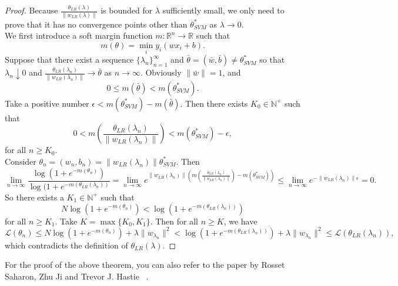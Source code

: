 \begin{proof}
	Because $\frac{\theta_{LR}(\lambda)}{\|w_{LR}(\lambda)\|}$ is bounded for $\lambda$ sufficiently small, we only need to prove that it has no convergence points other than $\theta^*_{SVM}$ as $\lambda \rightarrow 0$.\\
	We first introduce a soft margin function $m: \mathbb{R}^n \rightarrow \mathbb{R}$ such that 
	\begin{equation}
		m(\theta) = \min_{i} y_i(wx_i + b).
	\end{equation}
	Suppose that there exist a sequence $\{\lambda_n\}_{n = 1}^\infty$ and $\bar{\theta} = (\bar{w},\bar{b}) \neq \theta^*_{SVM}$ so that  $\lambda_n \downarrow 0$ and $\frac{\theta_{LR}(\lambda_n)}{\|w_{LR}(\lambda_n)\|} \rightarrow \bar{\theta}$ as $n\rightarrow \infty$. Obviously $\|\bar{w}\| = 1$, and 
    \begin{equation}
    	0 \leq m(\bar{\theta}) < m(\theta^*_{SVM}).
    \end{equation}
     Take a positive number $\epsilon < m(\theta^*_{SVM}) - m(\bar{\theta})$. Then there exists $K_0\in \mathbb{N}^+$ such that 
    \begin{equation}
    0 < m(\frac{\theta_{LR}(\lambda_n)}{\|w_{LR}(\lambda_n)\|}) <  m(\theta^*_{SVM})- \epsilon,
    \end{equation}
    for all $n \geq K_0$.\\
    
    Consider $\theta_n = (w_n,b_n) = \|w_{LR}(\lambda_n)\|\theta^*_{SVM}$. Then
    \begin{equation}
    \lim_{n\rightarrow \infty} \frac{\log(1 + e^{-m(\theta_n)})}{\log(1 + e^{-m(\theta_{LR}(\lambda_n))}} = \lim_{n \rightarrow \infty} e^{\|w_{LR}(\lambda_n)\| (m(\frac{\theta_{LR}(\lambda_n)}{\|w_{LR}(\lambda_n)\|}) -  m(\theta^*_{SVM}))} \leq \lim_{n \rightarrow \infty} e^{-\|w_{LR}(\lambda_n)\| \epsilon} = 0.
    \end{equation}
    So there exists a $K_1 \in \mathbb{N}^+$ such that 
    \begin{equation}
    	N \log(1 + e^{-m(\theta_n)}) < \log(1 + e^{-m(\theta_{LR}(\lambda_n))}) 
    \end{equation}
    for all $n \geq K_1$. Take $K  = \max\{K_0, K _1\}$. Then for all $n \geq K$, we have 
    \begin{equation}
    	\mathcal{L}(\theta_n) \leq N \log(1 + e^{-m(\theta_n)}) + \lambda \|w_{\lambda_n}\|^2 < \log(1 + e^{-m(\theta_{LR}(\lambda_n))})+ \lambda \|w_{\lambda_n}\|^2 \leq \mathcal{L}(\theta_{LR}(\lambda_n)),
    \end{equation} 
    which contradicts the definition of $\theta_{LR}(\lambda)$.
\end{proof}


For the proof of the above theorem, you can also refer to the paper by Rosset Saharon, Zhu Ji and Trevor J. Hastie~ \cite{rosset2004margin}. 